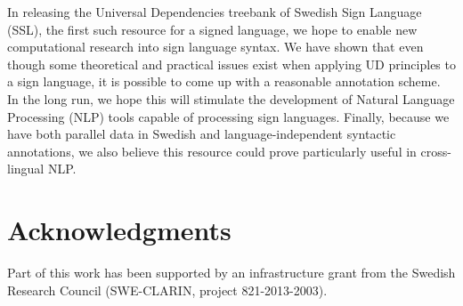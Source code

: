 \documentclass[11pt]{article}
\begin{document}
In releasing the Universal Dependencies treebank of Swedish Sign Language
(SSL), the first such resource for a signed language,
we hope to enable new computational research into sign language syntax.
We have shown that even though some theoretical and practical issues exist
when applying UD principles to a sign language, it is possible to come up with
a reasonable annotation scheme. In the long run, we hope this will
stimulate the development of Natural
Language Processing (NLP) tools capable of processing sign languages.
Finally, because we have both parallel data in Swedish and language-independent
syntactic annotations, we also believe this resource could prove particularly
useful in cross-lingual NLP.


\section*{Acknowledgments}

Part of this work has been supported by an infrastructure grant from the
Swedish Research Council (SWE-CLARIN, project 821-2013-2003).




\end{document}
